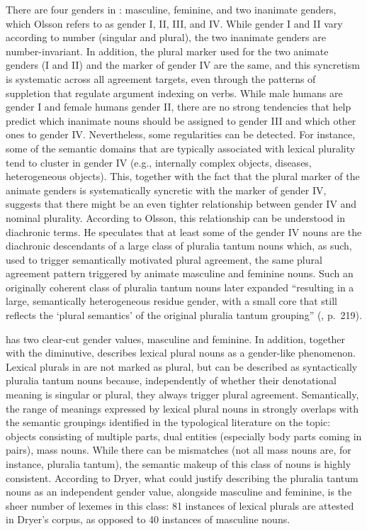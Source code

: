 \documentclass[output=collectionpaper]{langsci/langscibook}
\begin{document}
There are four genders in : masculine, feminine, and two inanimate genders, which Olsson refers to as gender I, II, III, and IV. While gender I and II vary according to number (singular and plural), the two inanimate genders are number-invariant. In addition, the plural marker used for the two animate genders (I and II) and the marker of gender IV are the same, and this syncretism is systematic across all agreement targets, even through the patterns of suppletion that regulate argument indexing on verbs. While male humans are gender I and female humans gender II, there are no strong tendencies that help predict which inanimate nouns should be assigned to gender III and which other ones to gender IV. Nevertheless, some regularities can be detected. For instance, some of the semantic domains that are typically associated with lexical plurality tend to cluster in gender IV (e.g., internally complex objects, diseases, heterogeneous objects). This, together with the fact that the plural marker of the animate genders is systematically syncretic with the marker of gender IV, suggests that there might be an even tighter relationship between gender IV and nominal plurality. According to Olsson, this relationship can be understood in diachronic terms. He speculates that at least some of the gender IV nouns are the diachronic descendants of a large class of pluralia tantum nouns which, as such, used to trigger semantically motivated plural agreement, the same plural agreement pattern triggered by animate masculine and feminine nouns. Such an originally coherent class of pluralia tantum nouns later expanded ``resulting in a large, semantically heterogeneous residue gender, with a small core that still reflects the `plural semantics' of the original pluralia tantum grouping'' (, p.~219).

 has two clear-cut gender values, masculine and feminine. In addition, together with the diminutive,  describes lexical plural nouns as a gender-like phenomenon. Lexical plurals in  are not marked as plural, but can be described as syntactically pluralia tantum nouns because, independently of whether their denotational meaning is singular or plural, they always trigger plural agreement. Semantically, the range of meanings expressed by lexical plural nouns in  strongly overlaps with the semantic groupings identified in the typological literature on the topic: objects consisting of multiple parts, dual entities (especially body parts coming in pairs), mass nouns. While there can be mismatches (not all mass nouns are, for instance, pluralia tantum), the semantic makeup of this class of nouns is highly consistent. According to Dryer, what could justify describing the  pluralia tantum nouns as an independent gender value, alongside masculine and feminine, is the sheer number of lexemes in this class: 81 instances of lexical plurals are attested in Dryer's corpus, as opposed to 40 instances of masculine nouns.
\end{document}
